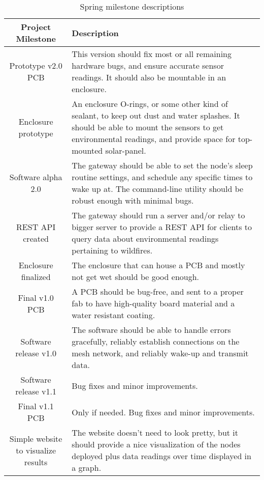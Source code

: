 \begin{table}[H]    
    \centering
    \begin{tabularx}{\linewidth}{|c|X|}
        \hline
        Project Milestone & Description 
        \\
        \hline\hline
        Prototype v2.0 PCB 
        & This version should fix most or all remaining hardware bugs, and ensure accurate sensor readings. It should also be mountable in an enclosure.
        \\
        
        \hline
        Enclosure prototype
        & An enclosure O-rings, or some other kind of sealant, to keep out dust and water splashes. It should be able to mount the sensors to get environmental readings, and provide space for top-mounted solar-panel.
        \\
        
        \hline
        Software alpha 2.0 
        & The gateway should be able to set the node's sleep routine settings, and schedule any specific times to wake up at. The command-line utility should be robust enough with minimal bugs.
        \\
        
        \hline
        REST API created
        & The gateway should run a server and/or relay to bigger server to provide a REST API for clients to query data about environmental readings pertaining to wildfires.
        \\
        
        \hline
        Enclosure finalized
        & The enclosure that can house a PCB and mostly not get wet should be good enough.
        \\
        
        \hline
        Final v1.0 PCB
        & A PCB should be bug-free, and sent to a proper fab to have high-quality board material and a water resistant coating.
        \\
        
        \hline
        Software release v1.0
        & The software should be able to handle errors gracefully, reliably establish connections on the mesh network, and reliably wake-up and transmit data.
        \\ 
        
        \hline
        Software release v1.1
        & Bug fixes and minor improvements.
        \\ 
        
        \hline
        Final v1.1 PCB
        & Only if needed. Bug fixes and minor improvements.
        \\
        
        \hline
        Simple website to visualize results
        & The website doesn't need to look pretty, but it should provide a nice visualization of the nodes deployed plus data readings over time displayed in a graph.
        \\
        
        \hline
    \end{tabularx}
    \caption{Spring milestone descriptions}
    \label{spring-milestone-descriptions}
\end{table}

